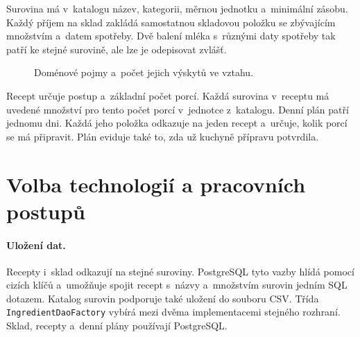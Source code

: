 \documentclass[11pt,a4paper,oneside]{report}
\begin{document}
Surovina má v~katalogu název, kategorii, měrnou jednotku a~minimální
zásobu. Každý příjem na sklad zakládá samostatnou skladovou položku
se zbývajícím množstvím a~datem spotřeby. Dvě balení mléka s~různými
daty spotřeby tak patří ke stejné surovině, ale lze je odepisovat zvlášť.

\begin{figure}[htbp]
\centering
{}
\caption{Doménové pojmy a~počet jejich výskytů ve vztahu.}
\end{figure}

Recept určuje postup a~základní počet porcí. Každá surovina v~receptu
má uvedené množství pro tento počet porcí v~jednotce z~katalogu.
Denní plán patří jednomu dni. Každá jeho položka odkazuje na jeden
recept a~určuje, kolik porcí se má připravit. Plán eviduje také to,
zda už kuchyně přípravu potvrdila.

\section{Volba technologií a pracovních postupů}

\paragraph{Uložení dat.}
Recepty i~sklad odkazují na stejné suroviny. PostgreSQL tyto vazby
hlídá pomocí cizích klíčů a~umožňuje spojit recept s~názvy a~množstvím
surovin jedním SQL dotazem. Katalog surovin podporuje také uložení
do souboru CSV. Třída \texttt{IngredientDaoFactory} vybírá mezi dvěma
implementacemi stejného rozhraní. Sklad, recepty a~denní plány používají
PostgreSQL.
\end{document}
